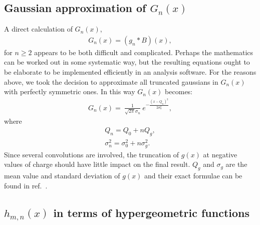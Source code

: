 \documentclass[preprint,12pt]{elsarticle}
\begin{document}
\subsection{Gaussian approximation of $G_n(x)$}
%

A direct calculation of $G_n(x)$, 
\begin{align}
G_n(x)  = (g_n*B)(x),
\end{align}   
for $n\geq 2$ appears to be both difficult and complicated. 
Perhaps the mathematics can be worked out in some systematic way, but the resulting equations ought to be elaborate to be implemented efficiently in an analysis software. 
For the reasons above, we took the decision to approximate all truncated gaussians in $G_n(x)$ with perfectly symmetric ones. 
In this way $G_n(x)$ becomes:
\begin{align}
G_n(x)  = \ \frac{1}{\sqrt{2\pi} \sigma_n } \ e^{ -\frac{ (x-Q_n)^2 }{2\sigma_n^2} },
\end{align}   
where
\begin{align}
Q_n  = Q_0 + n Q_g, \\
\sigma_n^2 = \sigma_0^2 + n \sigma_g^2.  
\end{align}   
Since several convolutions are involved, the truncation of $g(x)$ at negative values of charge should have little impact on the final result.  
$Q_g$ and $\sigma_g$ are the mean value and standard deviation of $g(x)$ and their exact formulae can be found in ref.~\cite{me2}.


\subsection{$h_{m,n}(x)$ in terms of hypergeometric functions}
%
\end{document}
